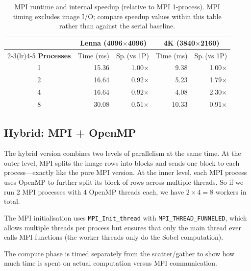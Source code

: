 \documentclass[12pt,a4paper]{article}
\begin{document}
\begin{table}[H]
\centering\small
\begin{tabular}{@{}c rr rr@{}}
\toprule
 & \multicolumn{2}{c}{\textbf{Lenna (4096$\times$4096)}} &
   \multicolumn{2}{c}{\textbf{4K (3840$\times$2160)}} \\
\cmidrule(lr){2-3}\cmidrule(lr){4-5}
\textbf{Processes} & Time (ms) & Sp.\,(vs 1P) & Time (ms) & Sp.\,(vs 1P) \\
\midrule
1 & 15.36 & 1.00$\times$ & 9.38  & 1.00$\times$ \\
2 & 16.64 & 0.92$\times$ & 5.23  & 1.79$\times$ \\
4 & 16.64 & 0.92$\times$ & 4.08  & 2.30$\times$ \\
8 & 30.08 & 0.51$\times$ & 10.33 & 0.91$\times$ \\
\bottomrule
\end{tabular}
\caption{MPI runtime and internal speedup (relative to MPI 1-process). MPI
  timing excludes image I/O; compare speedup values within this table rather
  than against the serial baseline.}
\label{tab:t_mpi}
\end{table}

\subsection{Hybrid: MPI + OpenMP}
\label{subsec:hybrid}

The hybrid version combines two levels of parallelism at the same time. At
the outer level, MPI splits the image rows into blocks and sends one block to
each process---exactly like the pure MPI version. At the inner level, each
MPI process uses OpenMP to further split its block of rows across multiple
threads. So if we run 2 MPI processes with 4 OpenMP threads each, we have
$2 \times 4 = 8$ workers in total.

The MPI initialisation uses \texttt{MPI\_Init\_thread} with
\texttt{MPI\_THREAD\_FUNNELED}, which allows multiple threads per process but
ensures that only the main thread ever calls MPI functions (the worker
threads only do the Sobel computation).

The compute phase is timed separately from the scatter/gather to show how
much time is spent on actual computation versus MPI communication.
\end{document}
